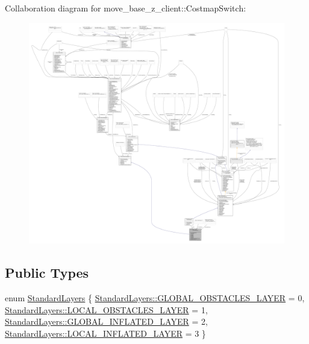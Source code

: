 Collaboration diagram for move\+\_\+base\+\_\+z\+\_\+client\+:\+:Costmap\+Switch\+:
\nopagebreak
\begin{figure}[H]
\begin{center}
\leavevmode
\includegraphics[width=350pt]{classmove__base__z__client_1_1CostmapSwitch__coll__graph}
\end{center}
\end{figure}
\subsection*{Public Types}
\begin{DoxyCompactItemize}
\item 
enum \hyperlink{classmove__base__z__client_1_1CostmapSwitch_a810338d2ba3fe25fc4ecf8c6c85b462b}{Standard\+Layers} \{ \hyperlink{classmove__base__z__client_1_1CostmapSwitch_a810338d2ba3fe25fc4ecf8c6c85b462ba94404229e09ab748aab0096bd5ff3656}{Standard\+Layers\+::\+G\+L\+O\+B\+A\+L\+\_\+\+O\+B\+S\+T\+A\+C\+L\+E\+S\+\_\+\+L\+A\+Y\+ER} = 0, 
\hyperlink{classmove__base__z__client_1_1CostmapSwitch_a810338d2ba3fe25fc4ecf8c6c85b462baff8d30cf6ceac8551691e28c328aebe6}{Standard\+Layers\+::\+L\+O\+C\+A\+L\+\_\+\+O\+B\+S\+T\+A\+C\+L\+E\+S\+\_\+\+L\+A\+Y\+ER} = 1, 
\hyperlink{classmove__base__z__client_1_1CostmapSwitch_a810338d2ba3fe25fc4ecf8c6c85b462ba1757575ee674622adfb325de182a65d6}{Standard\+Layers\+::\+G\+L\+O\+B\+A\+L\+\_\+\+I\+N\+F\+L\+A\+T\+E\+D\+\_\+\+L\+A\+Y\+ER} = 2, 
\hyperlink{classmove__base__z__client_1_1CostmapSwitch_a810338d2ba3fe25fc4ecf8c6c85b462baab9e94e9dc4c62e74e48ee34b11c8807}{Standard\+Layers\+::\+L\+O\+C\+A\+L\+\_\+\+I\+N\+F\+L\+A\+T\+E\+D\+\_\+\+L\+A\+Y\+ER} = 3
 \}
\end{DoxyCompactItemize}
